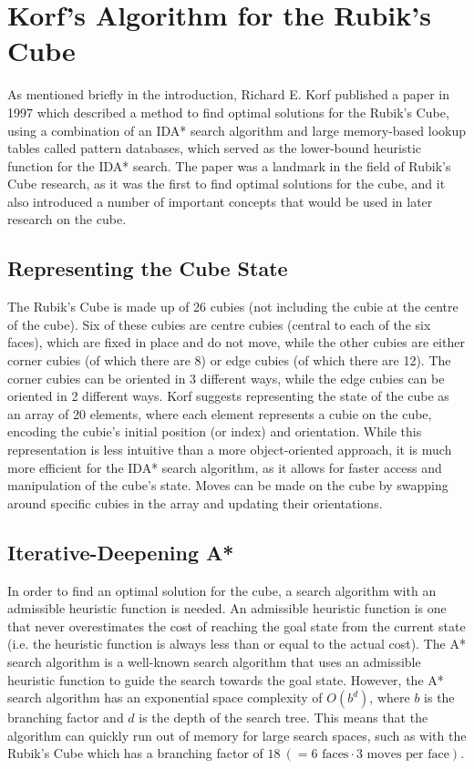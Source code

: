 \section{Korf's Algorithm for the Rubik's Cube}
As mentioned briefly in the introduction, Richard E. Korf published a paper in 1997 \cite{korf} which described a method to find optimal solutions for the Rubik's Cube, using a combination of an IDA* search algorithm and large memory-based lookup tables called pattern databases, which served as the lower-bound heuristic function for the IDA* search. The paper was a landmark in the field of Rubik's Cube research, as it was the first to find optimal solutions for the cube, and it also introduced a number of important concepts that would be used in later research on the cube.

\subsection{Representing the Cube State}
The Rubik's Cube is made up of 26 cubies (not including the cubie at the centre of the cube). Six of these cubies are centre cubies (central to each of the six faces), which are fixed in place and do not move, while the other cubies are either corner cubies (of which there are 8) or edge cubies (of which there are 12). The corner cubies can be oriented in 3 different ways, while the edge cubies can be oriented in 2 different ways. Korf suggests representing the state of the cube as an array of 20 elements, where each element represents a cubie on the cube, encoding the cubie's initial position (or index) and orientation. While this representation is less intuitive than a more object-oriented approach, it is much more efficient for the IDA* search algorithm, as it allows for faster access and manipulation of the cube's state. Moves can be made on the cube by swapping around specific cubies in the array and updating their orientations.

\subsection{Iterative-Deepening A*}
In order to find an optimal solution for the cube, a search algorithm with an admissible heuristic function is needed. An admissible heuristic function is one that never overestimates the cost of reaching the goal state from the current state (i.e. the heuristic function is always less than or equal to the actual cost). The A* search algorithm is a well-known search algorithm that uses an admissible heuristic function to guide the search towards the goal state. However, the A* search algorithm has an exponential space complexity of $O(b^d)$, where $b$ is the branching factor and $d$ is the depth of the search tree. This means that the algorithm can quickly run out of memory for large search spaces, such as with the Rubik's Cube which has a branching factor of $18 \ ( =6 \text{ faces} \cdot 3 \text{ moves per face})$.

